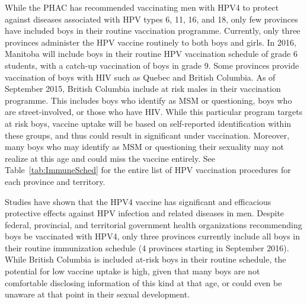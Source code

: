 \documentclass[12pt]{article}
\begin{document}
While the PHAC has recommended vaccinating men with HPV4 to protect against diseases associated with HPV types 6, 11, 16, and 18, only few provinces have included boys in their routine vaccination programme.  Currently, only three provinces administer the HPV vaccine routinely to both boys and girls.  In 2016, Manitoba will include boys in their routine HPV vaccination schedule of grade 6 students, with a catch-up vaccination of boys in grade 9.  Some provinces provide vaccination of boys with HIV such as Quebec and British Columbia.  As of September 2015, British Columbia include at risk males in their vaccination programme.  This includes boys who identify as MSM or questioning, boys who are street-involved, or those who have HIV. While this particular program targets at risk boys, vaccine uptake will be based on self-reported identification within these groups, and thus could result in significant under vaccination.  Moreover, many boys who may identify as MSM or questioning their sexuality may not realize at this age and could miss the vaccine entirely.  See Table~\ref{tab:ImmuneSched} for the entire list of HPV vaccination procedures for each province and territory.  

Studies have shown that the HPV4 vaccine has significant and efficacious protective effects against HPV infection and related diseases in men.  Despite federal, provincial, and territorial government health organizations recommending boys be vaccinated with HPV4, only three provinces currently include all boys in their routine immunization schedule (4 provinces starting in September 2016).  While British Columbia is included at-risk boys in their routine schedule, the potential for low vaccine uptake is high, given that many boys are not comfortable disclosing information of this kind at that age, or could even be unaware at that point in their sexual development.  
\end{document}
